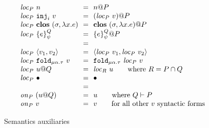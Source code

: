 \documentclass[10pt]{article}
\makeatletter
\newcommand{\kw}[1]{\ensuremath{\mathtt{#1}}}
\newcommand{\trec}[2]{\ensuremath{\mu {#1}.{#2}}}
\newcommand{\einj}[2]{\ensuremath{\kw{inj}_{#1}~{#2}}}
\newcommand{\epair}[2]{\ensuremath{\langle {#1}, {#2} \rangle}}
\newcommand{\elam}[2]{\ensuremath{\lambda {#1}.{#2}}}
\newcommand{\efold}[2]{\ensuremath{\kw{fold}_{#1}~{#2}}}
\newcommand{\vshare}[3]{\ensuremath{\{{#3}\}^{#1}_{#2}}}
\newcommand{\vloc}[2]{\ensuremath{{#1}\kw{@}{#2}}}
\newcommand{\vclos}[2]{\ensuremath{\mathbf{clos}~({#1},{#2})}}
\newcommand{\vcrash}{\ensuremath{\bullet}}
\newcommand{\env}{\ensuremath{\sigma}}
\newcommand{\locof}[2]{\ensuremath{\mathit{loc}_{#1}~{#2}}}
\newcommand{\getat}[2]{\ensuremath{\mathit{on}_{#1}~{#2}}}
\makeatother
\begin{document}
\begin{figure}
\[\begin{array}{l@{~~=~~}l}
    \locof{P}{n} & \vloc{n}{P} \\
    \locof{P}{\einj{i}{v}} & \vloc{(\locof{P}{v})}{P} \\
    \locof{P}{\vclos{\env}{\elam{x}{e}}} & \vloc{\vclos{\env}{\elam{x}{e}}}{P}\\
    \locof{P}{\vshare{Q}{\psi}{e}} & \vloc{\vshare{Q}{\psi}{e}}{P}
    \\ \\
    \locof{P}{\epair{v_1}{v_2}} & \epair{\locof{P}{v_1}}{\locof{P}{v_2}}\\
    \locof{P}{ \efold{\trec{\alpha}{\tau}}{v}} &  \efold{\trec{\alpha}{\tau}}{\locof{P}{v}}\\
    \locof{P}{\vloc{u}{Q}} & \locof{R}{u} \qquad\text{where }R = P \cap Q\\
    \locof{P}{\vcrash} & \vcrash
    \\ \\
    \getat{P}{(\vloc{u}{Q})} & u \qquad \text{where }Q \vdash P\\
    \getat{P}{v} & v \qquad \text{for all other $v$ syntactic forms}\\
  \end{array}
\]
\caption{Semantics auxiliaries}
\label{fig:auxsem}
\end{figure}
\end{document}
